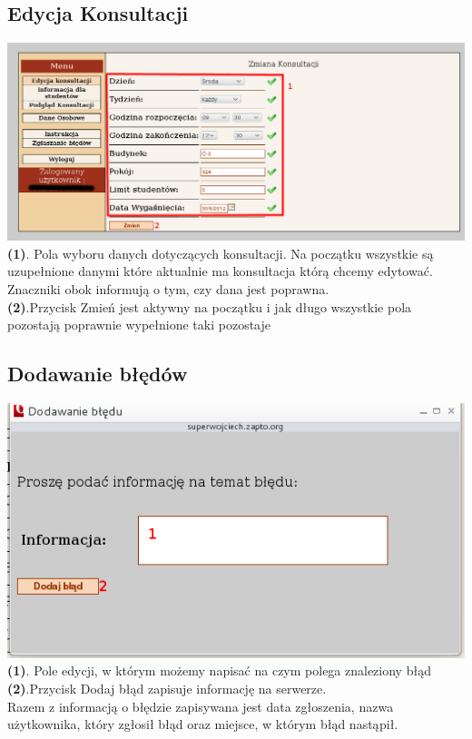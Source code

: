 \documentclass[12pt]{article} %
\begin{document}
\subsection{Edycja Konsultacji}
\includegraphics[width=1\textwidth]{instr7.png}\\
\textbf {(1)}. Pola wyboru danych dotyczących konsultacji. Na początku wszystkie
są uzupełnione danymi które aktualnie ma konsultacja którą chcemy edytować.
Znaczniki obok informują o tym, czy dana jest poprawna.\\
\textbf {(2)}.Przycisk Zmień jest aktywny na początku i jak długo wszystkie pola
pozostają poprawnie wypełnione taki pozostaje \\

\subsection{Dodawanie błędów}
\includegraphics[width=1\textwidth]{instr8.png}\\
\textbf {(1)}. Pole edycji, w którym możemy napisać na czym polega znaleziony
błąd\\
\textbf {(2)}.Przycisk Dodaj błąd zapisuje informację na serwerze. \\

Razem z informacją o błędzie zapisywana jest data zgłoszenia, nazwa użytkownika,
który zgłosił błąd oraz miejsce, w którym błąd nastąpił.
\end{document}

